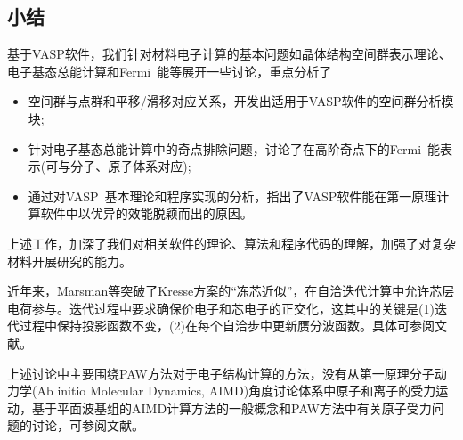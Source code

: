 \subsection{小结}
基于\textrm{VASP}软件，我们针对材料电子计算的基本问题如晶体结构空间群表示理论、电子基态总能计算和\textrm{Fermi~}能等展开一些讨论，重点分析了
\begin{itemize}
	\item 空间群与点群和平移/滑移对应关系，开发出适用于\textrm{VASP}软件的空间群分析模块;
	\item 针对电子基态总能计算中的奇点排除问题，讨论了在高阶奇点下的\textrm{Fermi~}能表示(可与分子、原子体系对应);~
	\item 通过对\textrm{VASP~}基本理论和程序实现的分析，指出了\textrm{VASP}软件能在第一原理计算软件中以优异的效能脱颖而出的原因。
\end{itemize}
上述工作，加深了我们对相关软件的理论、算法和程序代码的理解，加强了对复杂材料开展研究的能力。


近年来，\textrm{Marsman}等突破了\textrm{Kresse}方案的“冻芯近似”，在自洽迭代计算中允许芯层电荷参与。迭代过程中要求确保价电子和芯电子的正交化，这其中的关键是(1)迭代过程中保持投影函数不变，(2)在每个自洽步中更新赝分波函数。具体可参阅文献\cite{JCP125-104101_2006}。

上述讨论中主要围绕\textrm{PAW}方法对于电子结构计算的方法，没有从第一原理分子动力学\textrm{(Ab initio Molecular Dynamics, AIMD)}角度讨论体系中原子和离子的受力运动，基于平面波基组的\textrm{AIMD}计算方法的一般概念和\textrm{PAW}方法中有关原子受力问题的讨论，可参阅文献\cite{PRB47-10142_1993,PRB50-17953_1994,PRB59-1758_1999,Comput-Phys}。

